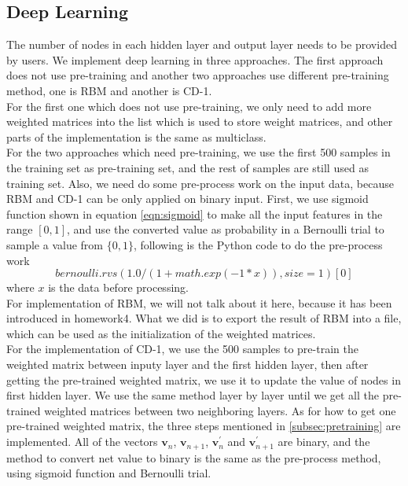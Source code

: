 \documentclass[11pt,letterpaper]{article}
\begin{document}
\subsection{Deep Learning}
The number of nodes in each hidden layer and output layer needs to be provided by users. We implement deep learning in three approaches. The first approach does not use pre-training and another two approaches use different pre-training method, one is RBM and another is CD-1. \\
For the first one which does not use pre-training, we only need to add more weighted matrices into the list which is used to store weight matrices, and other parts of the implementation is the same as multiclass.\\
For the two approaches which need pre-training, we use the first 500 samples in the training set as pre-training set, and the rest of samples are still used as training set. Also, we need do some pre-process work on the input data, because RBM and CD-1 can be only applied on binary input. First, we use sigmoid function shown in equation \ref{eqn:sigmoid} to make all the input features in the range $[0, 1]$, and use the converted value as probability in a Bernoulli trial to sample a value from $\{0, 1\}$, following is the Python code to do the pre-process work 
$$bernoulli.rvs(1.0/(1 + math.exp(-1 * x)), size=1)[0]$$
where $x$ is the data before processing. \\
For implementation of RBM, we will not talk about it here, because it has been introduced in homework4. What we did is to export the result of RBM into a file, which can be used as the initialization of the weighted matrices. \\
For the implementation of CD-1, we use the 500 samples to pre-train the weighted matrix between inputy layer and the first hidden layer, then after getting the pre-trained weighted matrix, we use it to update the value of nodes in first hidden layer. We use the same method layer by layer until we get all the pre-trained weighted matrices between two neighboring layers. As for how to get one pre-trained weighted matrix, the three steps mentioned in \ref{subsec:pretraining} are implemented. All of the vectors $\mathbf{v}_n$, $\mathbf{v}_{n+1}$, $\mathbf{v}^{\prime}_n$ and $\mathbf{v}^{\prime}_{n+1}$ are binary, and the method to convert net value to binary is the same as the pre-process method, using sigmoid function and Bernoulli trial. 
\end{document}
